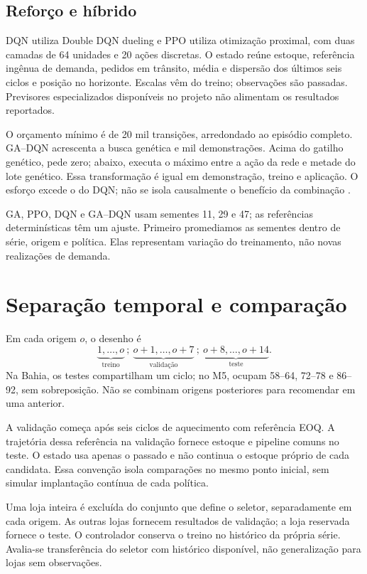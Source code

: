 \subsection{Reforço e híbrido}
DQN utiliza Double DQN dueling e PPO utiliza otimização proximal, com duas camadas de 64 unidades e 20 ações discretas. O estado reúne estoque, referência ingênua de demanda, pedidos em trânsito, média e dispersão dos últimos seis ciclos e posição no horizonte. Escalas vêm do treino; observações são passadas. Previsores especializados disponíveis no projeto não alimentam os resultados reportados.

O orçamento mínimo é de 20 mil transições, arredondado ao episódio completo. GA--DQN acrescenta a busca genética e mil demonstrações. Acima do gatilho genético, pede zero; abaixo, executa o máximo entre a ação da rede e metade do lote genético. Essa transformação é igual em demonstração, treino e aplicação. O esforço excede o do DQN; não se isola causalmente o benefício da combinação \citep{Zabraoui2025GaDQN}.

GA, PPO, DQN e GA--DQN usam sementes 11, 29 e 47; as referências determinísticas têm um ajuste. Primeiro promediamos as sementes dentro de série, origem e política. Elas representam variação do treinamento, não novas realizações de demanda.

\section{Separação temporal e comparação}
\label{sec:simulacao_benchmark}\label{sec:wf_protocol}
Em cada origem $o$, o desenho é
\begin{equation}
 \underbrace{1,\ldots,o}_{\text{treino}}\ ;\
 \underbrace{o+1,\ldots,o+7}_{\text{validação}}\ ;\
 \underbrace{o+8,\ldots,o+14}_{\text{teste}}.
 \label{eq:wf_splits}
\end{equation}
Na Bahia, os testes compartilham um ciclo; no M5, ocupam 58--64, 72--78 e 86--92, sem sobreposição. Não se combinam origens posteriores para recomendar em uma anterior.

A validação começa após seis ciclos de aquecimento com referência EOQ. A trajetória dessa referência na validação fornece estoque e pipeline comuns no teste. O estado usa apenas o passado e não continua o estoque próprio de cada candidata. Essa convenção isola comparações no mesmo ponto inicial, sem simular implantação contínua de cada política.

Uma loja inteira é excluída do conjunto que define o seletor, separadamente em cada origem. As outras lojas fornecem resultados de validação; a loja reservada fornece o teste. O controlador conserva o treino no histórico da própria série. Avalia-se transferência do seletor com histórico disponível, não generalização para lojas sem observações.

